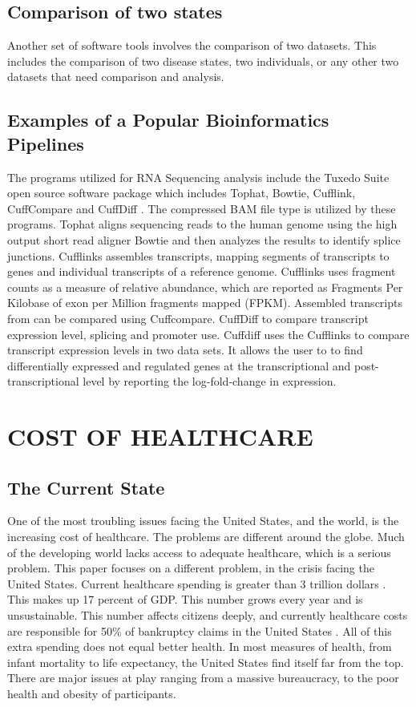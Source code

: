 \documentclass[sigconf]{acmart}
\begin{document}
\subsection{Comparison of two states} 
Another set of software tools involves the comparison of two datasets.  This includes the comparison of two disease states, two individuals, or any other two datasets that need comparison and analysis.   

\subsection{Examples of a Popular Bioinformatics Pipelines}  
The programs utilized for RNA Sequencing analysis include the Tuxedo Suite open source software package which includes Tophat, Bowtie, Cufflink, CuffCompare and CuffDiff \cite{trapnell2009tophat}.  The compressed BAM file type  is utilized by these programs.  Tophat aligns  sequencing reads to the human genome using the high output short read aligner Bowtie and then analyzes the results to identify splice junctions.  Cufflinks assembles transcripts, mapping segments of transcripts to genes and individual transcripts of a reference genome.  Cufflinks uses fragment counts as a measure of relative abundance, which are reported as Fragments Per Kilobase of exon per Million fragments mapped (FPKM).  Assembled transcripts from can be compared using Cuffcompare.  CuffDiff to compare transcript expression level, splicing and promoter use.  Cuffdiff uses the Cufflinks to compare transcript expression levels in two data sets.  It allows  the user to to find differentially expressed and regulated genes at the transcriptional and post-transcriptional level by reporting the log-fold-change in expression.  

\section{COST OF HEALTHCARE}

\subsection{The Current State}

One of the most troubling issues facing the United States, and the
world, is the increasing cost of healthcare.  The problems are
different around the globe.  Much of the developing world lacks access
to adequate healthcare, which is a serious problem. This paper focuses
on a different problem, in the crisis facing the United
States. Current healthcare spending is greater than 3 trillion dollars
\cite{centers2014national}.  This makes up 17 percent of GDP.  This number grows every year
and is unsustainable.  This number affects citizens deeply, and
currently healthcare costs are responsible for 50\% of bankruptcy
claims in the United States \cite{fox6}. All of this extra spending does not
equal better health.  In most measures of health, from infant
mortality to life expectancy, the United States find itself far from
the top.  There are major issues at play ranging from a massive
bureaucracy, to the poor health and obesity of participants.
\end{document}
